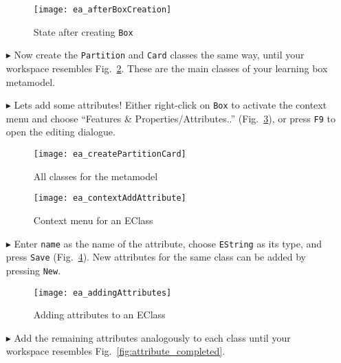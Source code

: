 \begin{itemize}
\begin{figure}[htbp]
	\centering
  \texttt{[image: ea\_afterBoxCreation]}
	\caption{State after creating \texttt{Box}}
	\label{fig:eclass_completed}
\end{figure}

\item[$\blacktriangleright$] Now create the \texttt{Partition} and \texttt{Card} classes the same way, until your workspace resembles
Fig.~\ref{fig:all_eclasses}. These are the main classes of your learning box metamodel.

\vspace{0.5cm}

\item[$\blacktriangleright$] Lets add some attributes! Either right-click on \texttt{Box} to activate the context menu and choose ``Features \&
Properties/Attributes..'' (Fig.~\ref{fig:attribute}), or press \texttt{F9} to open the editing dialogue.

\begin{figure}[htbp]
	\centering
  \texttt{[image: ea\_createPartitionCard]}
	\caption{All classes for the metamodel}
	\label{fig:all_eclasses}
\end{figure}

\begin{figure}[htbp]
	\centering
  \texttt{[image: ea\_contextAddAttribute]}
	\caption{Context menu for an EClass}
	\label{fig:attribute}
\end{figure}
\FloatBarrier

\item[$\blacktriangleright$] Enter \texttt{name} as the name of the attribute, choose \texttt{EString} as its type, and press
\texttt{Save} (Fig.~\ref{fig:attribute_properties}). New attributes for the same class can be added by pressing \texttt{New}.

\vspace{1.0cm}

\begin{figure}[htbp]
	\centering
  \texttt{[image: ea\_addingAttributes]}
	\caption{Adding attributes to an EClass}
	\label{fig:attribute_properties}
\end{figure}

\vspace{0.5cm}

\item[$\blacktriangleright$] Add the remaining attributes analogously to each class until your workspace resembles Fig.~\ref{fig:attribute_completed}.


\end{itemize}
